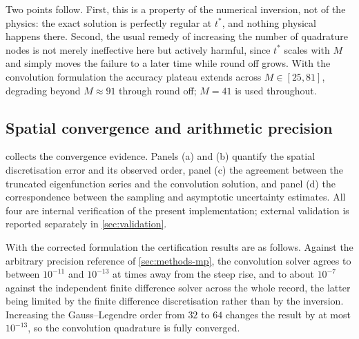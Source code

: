 \documentclass[preprint,12pt,a4paper]{elsarticle}
\theoremstyle{plain}
\theoremstyle{definition}
\theoremstyle{remark}
\begin{document}
Two points follow. First, this is a property of the numerical inversion, not of
the physics: the exact solution is perfectly regular at $t^{\ast}$, and nothing
physical happens there. Second, the usual remedy of increasing the number of
quadrature nodes is not merely ineffective here but actively harmful, since
$t^{\ast}$ scales with $M$ and simply moves the failure to a later time while
round off grows. With the convolution formulation the accuracy plateau extends
across $M \in [25,81]$, degrading beyond $M \approx 91$ through round off;
$M = 41$ is used throughout.

\subsection{Spatial convergence and arithmetic precision}
\label{sec:cert-conv}

 collects the convergence evidence. Panels (a) and (b)
quantify the spatial discretisation error and its observed order, panel (c) the
agreement between the truncated eigenfunction series and the convolution
solution, and panel (d) the correspondence between the sampling and asymptotic
uncertainty estimates. All four are internal verification of the present
implementation; external validation is reported separately in
\cref{sec:validation}.

With the corrected formulation the certification results are as follows.
Against the arbitrary precision reference of \cref{sec:methods-mp}, the
convolution solver agrees to between $10^{-11}$ and $10^{-13}$ at times away
from the steep rise, and to about $10^{-7}$ against the independent finite
difference solver across the whole record, the latter being limited by the
finite difference discretisation rather than by the inversion. Increasing the
Gauss--Legendre order from $32$ to $64$ changes the result by at most
$10^{-13}$, so the convolution quadrature is fully converged.
\end{document}
